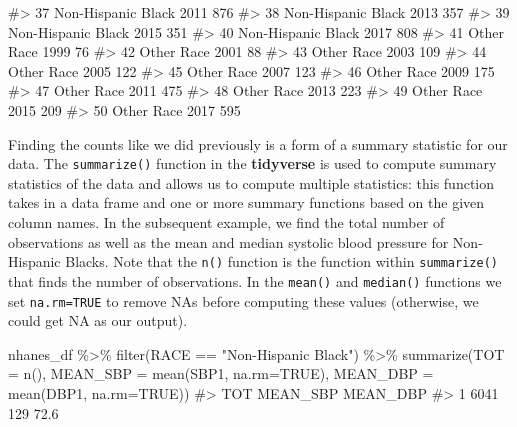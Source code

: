 \documentclass[
  letterpaper,
]{latex/krantz}
\makeatletter
\newenvironment{Shaded}{\begin{snugshade}}{\end{snugshade}}
\newcommand{\AttributeTok}[1]{\textcolor[rgb]{0.40,0.45,0.13}{#1}}
\newcommand{\CommentTok}[1]{\textcolor[rgb]{0.37,0.37,0.37}{#1}}
\newcommand{\ConstantTok}[1]{\textcolor[rgb]{0.56,0.35,0.01}{#1}}
\newcommand{\FunctionTok}[1]{\textcolor[rgb]{0.28,0.35,0.67}{#1}}
\newcommand{\NormalTok}[1]{\textcolor[rgb]{0.00,0.23,0.31}{#1}}
\newcommand{\SpecialCharTok}[1]{\textcolor[rgb]{0.37,0.37,0.37}{#1}}
\newcommand{\StringTok}[1]{\textcolor[rgb]{0.13,0.47,0.30}{#1}}
\newenvironment{kframe}{%
\medskip{}
\setlength{\fboxsep}{.8em}
 \def\at@end@of@kframe{}%
 \ifinner\ifhmode%
  \def\at@end@of@kframe{\end{minipage}}%
  \begin{minipage}{\columnwidth}%
 \fi\fi%
 \def\FrameCommand##1{\hskip\@totalleftmargin \hskip-\fboxsep
 \colorbox{shadecolor}{##1}\hskip-\fboxsep
     \hskip-\linewidth \hskip-\@totalleftmargin \hskip\columnwidth}%
 \MakeFramed {\advance\hsize-\width
   \@totalleftmargin\z@ \linewidth\hsize
   \@setminipage}}%
 {\par\unskip\endMakeFramed%
 \at@end@of@kframe}
\renewenvironment{Shaded}{\begin{kframe}}{\end{kframe}}
\makeatother
\begin{document}
\begin{Shaded}
\begin{Highlighting}[]
\CommentTok{\#\textgreater{} 37 Non{-}Hispanic Black 2011  876}
\CommentTok{\#\textgreater{} 38 Non{-}Hispanic Black 2013  357}
\CommentTok{\#\textgreater{} 39 Non{-}Hispanic Black 2015  351}
\CommentTok{\#\textgreater{} 40 Non{-}Hispanic Black 2017  808}
\CommentTok{\#\textgreater{} 41         Other Race 1999   76}
\CommentTok{\#\textgreater{} 42         Other Race 2001   88}
\CommentTok{\#\textgreater{} 43         Other Race 2003  109}
\CommentTok{\#\textgreater{} 44         Other Race 2005  122}
\CommentTok{\#\textgreater{} 45         Other Race 2007  123}
\CommentTok{\#\textgreater{} 46         Other Race 2009  175}
\CommentTok{\#\textgreater{} 47         Other Race 2011  475}
\CommentTok{\#\textgreater{} 48         Other Race 2013  223}
\CommentTok{\#\textgreater{} 49         Other Race 2015  209}
\CommentTok{\#\textgreater{} 50         Other Race 2017  595}
\end{Highlighting}
\end{Shaded}

Finding the counts like we did previously is a form of a summary
statistic for our data. The
\texttt{summarize()}
function in the \textbf{tidyverse} is used to compute summary statistics
of the data and allows us to compute multiple statistics: this function
takes in a data frame and one or more summary functions based on the
given column names. In the subsequent example, we find the total number
of observations as well as the mean and median systolic blood pressure
for Non-Hispanic Blacks. Note that the
\texttt{n()} function is the
function within \texttt{summarize()} that finds the number of
observations. In the \texttt{mean()} and \texttt{median()} functions we
set \texttt{na.rm=TRUE} to remove NAs before computing these values
(otherwise, we could get NA as our output).

\begin{Shaded}
\begin{Highlighting}[]
\NormalTok{nhanes\_df }\SpecialCharTok{\%\textgreater{}\%}
  \FunctionTok{filter}\NormalTok{(RACE }\SpecialCharTok{==} \StringTok{"Non{-}Hispanic Black"}\NormalTok{) }\SpecialCharTok{\%\textgreater{}\%}
  \FunctionTok{summarize}\NormalTok{(}\AttributeTok{TOT =} \FunctionTok{n}\NormalTok{(), }\AttributeTok{MEAN\_SBP =} \FunctionTok{mean}\NormalTok{(SBP1, }\AttributeTok{na.rm=}\ConstantTok{TRUE}\NormalTok{), }
            \AttributeTok{MEAN\_DBP =} \FunctionTok{mean}\NormalTok{(DBP1, }\AttributeTok{na.rm=}\ConstantTok{TRUE}\NormalTok{))}
\CommentTok{\#\textgreater{}    TOT MEAN\_SBP MEAN\_DBP}
\CommentTok{\#\textgreater{} 1 6041      129     72.6}
\end{Highlighting}
\end{Shaded}
\end{document}
